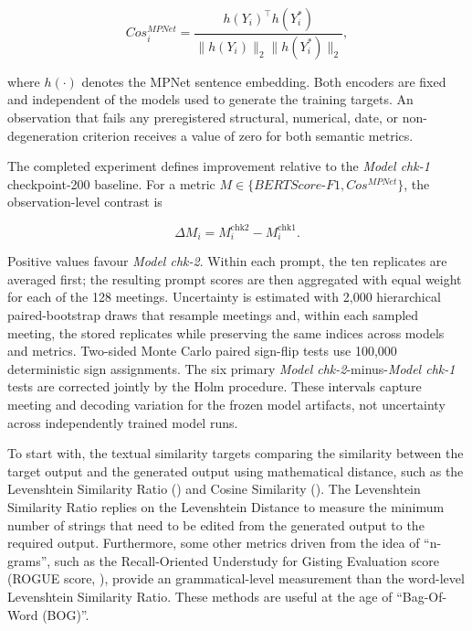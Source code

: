 \begin{equation}
    Cos_i^{MPNet}
    =\frac{h(Y_i)^{\top}h(Y_i^{*})}
    {\lVert h(Y_i)\rVert_2\lVert h(Y_i^{*})\rVert_2},
\end{equation}

where \(h(\cdot)\) denotes the MPNet sentence embedding.  Both encoders are
fixed and independent of the models used to generate the training targets.
An observation that fails any preregistered structural, numerical, date, or
non-degeneration criterion receives a value of zero for both semantic metrics.

The completed experiment defines improvement relative to the
\textit{Model chk-1} checkpoint-200 baseline. For a metric
\(M\in\{BERTScore\text{-}F1,Cos^{MPNet}\}\), the observation-level contrast is

\begin{equation}
    \Delta M_i=M_i^{\mathrm{chk2}}-M_i^{\mathrm{chk1}}.
\end{equation}

Positive values favour \textit{Model chk-2}. Within each prompt, the ten
replicates are averaged first; the resulting prompt scores are then aggregated
with equal weight for each of the 128 meetings. Uncertainty is estimated with
2,000 hierarchical paired-bootstrap draws that resample meetings and, within
each sampled meeting, the stored replicates while preserving the same indices
across models and metrics. Two-sided Monte Carlo paired sign-flip tests use
100,000 deterministic sign assignments. The six primary
\textit{Model chk-2}-minus-\textit{Model chk-1} tests are corrected jointly by
the Holm procedure. These intervals capture meeting and decoding variation for
the frozen model artifacts, not uncertainty across independently trained model
runs.

\iffalse

To start with, the textual similarity targets comparing the similarity between the target output and the generated output using mathematical distance, such as the Levenshtein Similarity Ratio (\cite{levenshtein1966binary}) and Cosine Similarity (\cite{tanguy2016natural}). The Levenshtein Similarity Ratio replies on the Levenshtein Distance to measure the minimum number of strings that need to be edited from the generated output to the required output. Furthermore, some other metrics driven from the idea of ``n-grams'', such as the Recall-Oriented Understudy for Gisting Evaluation score (ROGUE score, \cite{lin2004rouge}), provide an grammatical-level measurement than the word-level Levenshtein Similarity Ratio. These methods are useful at the age of ``Bag-Of-Word (BOG)''.

